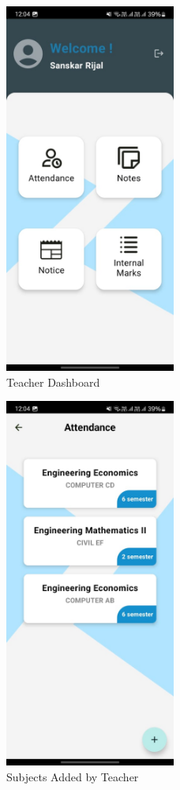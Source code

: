 \begin{figure}[H]
    \centering
    \includegraphics[width=0.5\textwidth]{Graphics/output/teacher_dashboard.jpg}
    \caption{Teacher Dashboard}
    \label{fig:teacher_dashboard}
\end{figure}

\begin{figure}[H]
    \centering
    \includegraphics[width=0.5\textwidth]{Graphics/output/teacher_subjects.jpg}
    \caption{Subjects Added by Teacher}
    \label{fig:teacher_subjects}
\end{figure}

